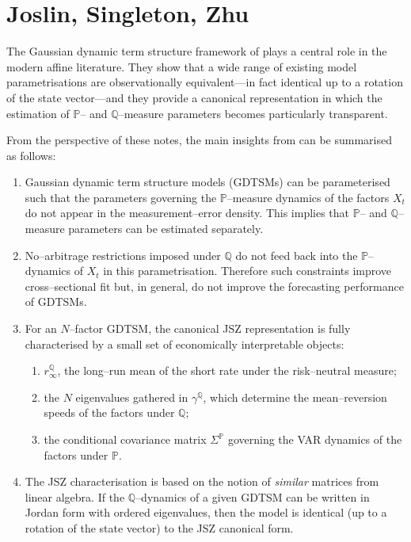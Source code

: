 \documentclass[
  letterpaper,
  DIV=11,
  numbers=noendperiod]{scrreprt}
\begin{document}
\section{Joslin, Singleton, Zhu}\label{joslin-singleton-zhu}

The Gaussian dynamic term structure framework of plays a central role in
the modern affine literature. They show that a wide range of existing
model parametrisations are observationally equivalent---in fact
identical up to a rotation of the state vector---and they provide a
canonical representation in which the estimation of \(\mathbb{P}\)-- and
\(\mathbb{Q}\)--measure parameters becomes particularly transparent.

From the perspective of these notes, the main insights from can be
summarised as follows:

\begin{enumerate}
\def\labelenumi{\arabic{enumi}.}
\item
  Gaussian dynamic term structure models (GDTSMs) can be parameterised
  such that the parameters governing the \(\mathbb{P}\)--measure
  dynamics of the factors \(X_t\) do not appear in the
  measurement--error density. This implies that \(\mathbb{P}\)-- and
  \(\mathbb{Q}\)--measure parameters can be estimated separately.
\item
  No--arbitrage restrictions imposed under \(\mathbb{Q}\) do not feed
  back into the \(\mathbb{P}\)--dynamics of \(X_t\) in this
  parametrisation. Therefore such constraints improve cross--sectional
  fit but, in general, do not improve the forecasting performance of
  GDTSMs.
\item
  For an \(N\)--factor GDTSM, the canonical JSZ representation is fully
  characterised by a small set of economically interpretable objects:

  \begin{enumerate}
  \def\labelenumii{\arabic{enumii}.}
  \item
    \(r^{\mathbb{Q}}_{\infty}\), the long--run mean of the short rate
    under the risk--neutral measure;
  \item
    the \(N\) eigenvalues gathered in \(\gamma^{\mathbb{Q}}\), which
    determine the mean--reversion speeds of the factors under
    \(\mathbb{Q}\);
  \item
    the conditional covariance matrix \(\Sigma^{\mathbb{P}}\) governing
    the VAR dynamics of the factors under \(\mathbb{P}\).
  \end{enumerate}
\item
  The JSZ characterisation is based on the notion of \emph{similar}
  matrices from linear algebra. If the \(\mathbb{Q}\)--dynamics of a
  given GDTSM can be written in Jordan form with ordered eigenvalues,
  then the model is identical (up to a rotation of the state vector) to
  the JSZ canonical form.
\end{enumerate}
\end{document}
